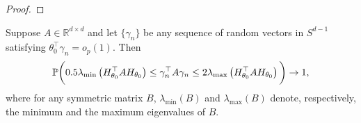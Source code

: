 \begin{proof}
\end{proof}
\begin{lemma}\label{lem:gamma_n}
Suppose $A\in\mathbb{R}^{d\times d}$ and let $\{\gamma_n\}$ be any sequence of random vectors in $S^{d - 1}$ satisfying $\theta_0^{\top}\gamma_n =o_p(1).$ Then 
\[
\mathbb{P}\bigg(0.5 \lambda_{\min}\left(H_{\theta_0}^{\top}AH_{\theta_0}\right) \le \gamma_n^{\top}A\gamma_n \le 2 \lambda_{\max}\left(H_{\theta_0}^{\top}AH_{\theta_0}\right)\bigg) \to 1,
\]
where for any symmetric matrix $B$, $\lambda_{\min}(B)$ and $\lambda_{\max}(B)$ denote, respectively, the minimum and the maximum eigenvalues of $B.$
\end{lemma}
